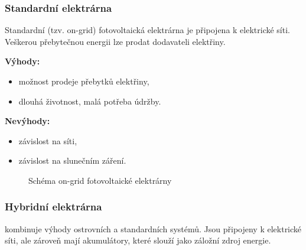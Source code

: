 \subsubsection{Standardní elektrárna}

Standardní (tzv. on-grid) fotovoltaická elektrárna je připojena k elektrické síti.
Veškerou přebytečnou energii lze prodat dodavateli elektřiny.

\begin{multicols}{2}
    \textbf{Výhody:}
    \begin{itemize}[leftmargin=*]
        \item možnost prodeje přebytků elektřiny,
        \item dlouhá životnost, malá potřeba údržby.
    \end{itemize}
    
    \columnbreak
    
    \textbf{Nevýhody:}
    \begin{itemize}[leftmargin=*]
        \item závislost na síti,
        \item závislost na slunečním záření.
    \end{itemize}
\end{multicols}


\begin{figure}[H]
    \centering
    \caption{Schéma on-grid fotovoltaické elektrárny}
    \label{fig:ongrid_schema}
    \end{figure}


\subsubsection{Hybridní elektrárna}

kombinuje výhody ostrovních a standardních systémů.
Jsou připojeny k elektrické síti, ale zároveň mají akumulátory, které slouží jako záložní zdroj energie.

